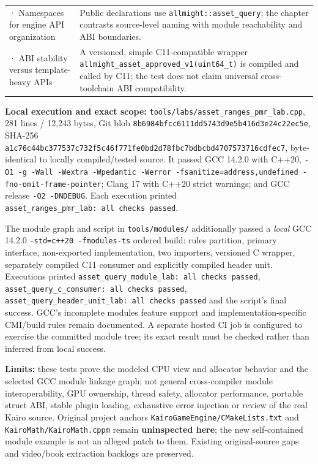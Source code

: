 {\begin{longtable}[]{@{}
  >{\raggedright\arraybackslash}p{}
  >{\raggedright\arraybackslash}p{}@{}}
289 · Namespaces for engine API organization & Public declarations use \texttt{allmight::asset\_query}; the chapter contrasts source-level naming with module reachability and ABI boundaries. \\
290 · ABI stability versus template-heavy APIs & A versioned, simple C11-compatible wrapper \texttt{allmight\_asset\_approved\_v1(uint64\_t)} is compiled and called by C11; the test does not claim universal cross-toolchain ABI compatibility. \\
\end{longtable}
}

\textbf{Local execution and exact scope:} \texttt{tools/labs/asset\_ranges\_pmr\_lab.cpp}, 281 lines / 12,243 bytes, Git blob \texttt{8b6984bfcc6111dd5743d9e5b416d3e24c22ec5e}, SHA-256 \texttt{a1c76c44bc377537c732f5c46f771fe0bd2d78fbc7bdbcbd4707573716cdfec7}, byte-identical to locally compiled/tested source. It passed GCC 14.2.0 with C++20, \texttt{-O1\ -g\ -Wall\ -Wextra\ -Wpedantic\ -Werror\ -fsanitize=address,undefined\ -fno-omit-frame-pointer}; Clang 17 with C++20 strict warnings; and GCC release \texttt{-O2\ -DNDEBUG}. Each execution printed \texttt{asset\_ranges\_pmr\_lab:\ all\ checks\ passed}.

The module graph and script in \texttt{tools/modules/} additionally passed a \emph{local} GCC 14.2.0 \texttt{-std=c++20\ -fmodules-ts} ordered build: rules partition, primary interface, non-exported implementation, two importers, versioned C wrapper, separately compiled C11 consumer and explicitly compiled header unit. Executions printed \texttt{asset\_query\_module\_lab:\ all\ checks\ passed}, \texttt{asset\_query\_c\_consumer:\ all\ checks\ passed}, \texttt{asset\_query\_header\_unit\_lab:\ all\ checks\ passed} and the script's final success. GCC's incomplete modules feature support and implementation-specific CMI/build rules remain documented. A separate hosted CI job is configured to exercise the committed module tree; its exact result must be checked rather than inferred from local success.

\textbf{Limits:} these tests prove the modeled CPU view and allocator behavior and the selected GCC module linkage graph; not general cross-compiler module interoperability, GPU ownership, thread safety, allocator performance, portable struct ABI, stable plugin loading, exhaustive error injection or review of the real Kairo source. Original project anchors \texttt{KairoGameEngine/CMakeLists.txt} and \texttt{KairoMath/KairoMath.cppm} remain \textbf{uninspected here}; the new self-contained module example is not an alleged patch to them. Existing original-source gaps and video/book extraction backlogs are preserved.

